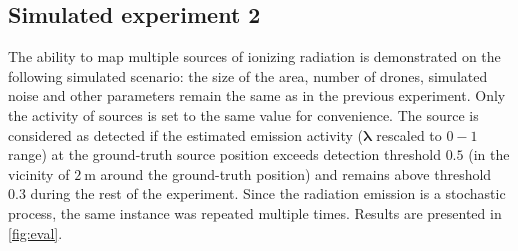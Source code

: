 \subsection{Simulated experiment 2}
The ability to map multiple sources of ionizing radiation is demonstrated on the following simulated scenario:
the size of the area, number of drones, simulated noise and other parameters remain the same as in the previous experiment.
Only the activity of sources is set to the same value for convenience.
The source is considered as detected if the estimated emission activity ($\bm{\lambda}$ rescaled to $0-1$ range) at the ground-truth source position exceeds detection threshold $0.5$ (in the vicinity of $\SI{2}{\meter}$ around the ground-truth position) and remains above threshold $0.3$ during the rest of the experiment.
Since the radiation emission is a stochastic process, the same instance was repeated multiple times.
Results are presented in \autoref{fig:eval}. %
